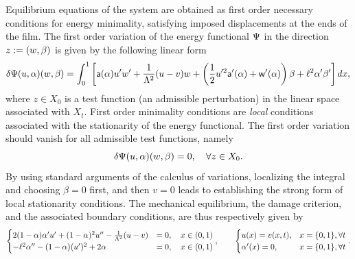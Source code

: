 Equilibrium equations of the system are obtained as first order necessary conditions for energy minimality, satisfying imposed displacements at the ends of the film.
The first order variation of the energy functional $\Psi$ in the direction $z:=(w, \beta)$ is given by the following linear form
\begin{equation}
    \delta \Psi(u,\alpha)(w,\beta)=\int_0^1
    \left[\mathsf{a}(\alpha)u'w'+\frac{1}{\Lambda^2} (u-v) w+ \left( \frac{1}{2}u'^2 \mathsf{a}'(\alpha)+\mathsf{w}'(\alpha) \right)\beta+\ell^2\alpha'\beta' \right]dx,\label{firstvar1}
\end{equation}
where
$z\in X_0$ is a test function (an admissible perturbation) in the linear space associated with  $X_t$. First order minimality conditions are \emph{local} conditions  associated with  the stationarity of the energy functional. The first order variation should vanish for all admissible test functions, namely
\begin{equation}
    \label{eq:stationarity}
    \delta \Psi(u,\alpha)(w,\beta)=0, \quad \forall z\in X_0.
\end{equation}
By using standard arguments of the calculus of variations, localizing the integral and choosing $\beta = 0$ first, and then $v =0$ leads to establishing the strong form of local stationarity conditions. The mechanical equilibrium, the damage criterion, {and the associated boundary conditions, } are thus respectively given by
\begin{eqnarray}
    \begin{cases}
        2(1-\alpha)\alpha' u' +(1-\alpha)^2 u'' -  \frac{1}{\Lambda^2}(u-v) & = 0, \quad {x\in (0, 1)} \\
        -\ell^2\alpha'' - (1-\alpha)( u')^2 + 2\alpha                         & = 0, \quad {x\in (0, 1)}
    \end{cases}
    ,    \qquad
    \begin{cases}
        u(x)       = v(x, t), & x=\{0, 1\}, \forall t \\
        \alpha'(x) = 0,            & x=\{0, 1\}, \forall t \\
    \end{cases}
    .
    \label{auto1}
\end{eqnarray}
